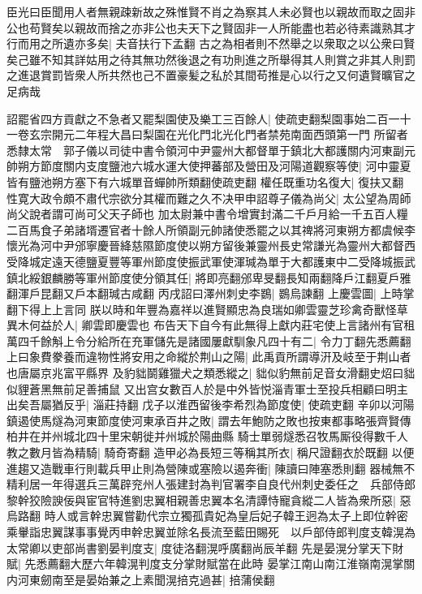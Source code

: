 臣光曰臣聞用人者無親疎新故之殊惟賢不肖之為察其人未必賢也以親故而取之固非公也苟賢矣以親故而捨之亦非公也夫天下之賢固非一人所能盡也若必待素識熟其才行而用之所遺亦多矣|{
	夫音扶行下孟翻}
古之為相者則不然舉之以衆取之以公衆曰賢矣己雖不知其詳姑用之待其無功然後退之有功則進之所舉得其人則賞之非其人則罰之進退賞罰皆衆人所共然也己不置豪髪之私於其間苟推是心以行之又何遺賢曠官之足病哉

詔罷省四方貢獻之不急者又罷梨園使及樂工三百餘人|{
	使疏吏翻梨園事始二百一十一卷玄宗開元二年程大昌曰梨園在光化門北光化門者禁苑南面西頭第一門}
所留者悉隸太常　郭子儀以司徒中書令領河中尹靈州大都督單于鎮北大都護關内河東副元帥朔方節度關内支度鹽池六城水運大使押蕃部及營田及河陽道觀察等使|{
	河中靈夏皆有鹽池朔方塞下有六城單音蟬帥所類翻使疏吏翻}
權任既重功名復大|{
	復扶又翻}
性寛大政令頗不肅代宗欲分其權而難之久不决甲申詔尊子儀為尚父|{
	太公望為周師尚父說者謂可尚可父天子師也}
加太尉兼中書令增實封滿二千戶月給一千五百人糧二百馬食子弟諸壻遷官者十餘人所領副元帥諸使悉罷之以其禆將河東朔方都虞候李懷光為河中尹邠寧慶晉絳慈隰節度使以朔方留後兼靈州長史常謙光為靈州大都督西受降城定遠天德鹽夏豐等軍州節度使振武軍使渾瑊為單于大都護東中二受降城振武鎮北綏銀麟勝等軍州節度使分領其任|{
	將即亮翻邠卑旻翻長知兩翻降戶江翻夏戶雅翻渾戶昆翻又戶本翻瑊古咸翻}
丙戌詔曰澤州刺史李鷃|{
	鷃烏諫翻}
上慶雲圖|{
	上時掌翻下得上上言同}
朕以時和年豐為嘉祥以進賢顯忠為良瑞如卿雲靈芝珍禽奇獸怪草異木何益於人|{
	卿雲即慶雲也}
布告天下自今有此無得上獻内莊宅使上言諸州有官租萬四千餘斛上令分給所在充軍儲先是諸國屢獻馴象凡四十有二|{
	令力丁翻先悉薦翻}
上曰象費豢養而違物性將安用之命縱於荆山之陽|{
	此禹貢所謂導汧及岐至于荆山者也唐屬京兆富平縣界}
及豹貀鬬雞獵犬之類悉縱之|{
	貀似豹無前足音女滑翻史炤曰貀似貍蒼黑無前足善捕鼠}
又出宫女數百人於是中外皆悦淄青軍士至投兵相顧曰明主出矣吾屬猶反乎|{
	淄莊持翻}
戊子以淮西留後李希烈為節度使|{
	使疏吏翻}
辛卯以河陽鎮遏使馬燧為河東節度使河東承百井之敗|{
	謂去年鮑防之敗也按東都事略張齊賢傳柏井在并州城北四十里宋朝徙并州城於陽曲縣}
騎士單弱燧悉召牧馬厮役得數千人教之數月皆為精騎|{
	騎奇寄翻}
造甲必為長短三等稱其所衣|{
	稱尺證翻衣於既翻}
以便進趨又造戰車行則載兵甲止則為營陳或塞險以遏奔衝|{
	陳讀曰陣塞悉則翻}
器械無不精利居一年得選兵三萬辟兖州人張建封為判官署李自良代州刺史委任之　兵部侍郎黎幹狡險諛佞與宦官特進劉忠翼相親善忠翼本名清譚恃寵貪縱二人皆為衆所惡|{
	惡烏路翻}
時人或言幹忠翼嘗勸代宗立獨孤貴妃為皇后妃子韓王迥為太子上即位幹密乘轝詣忠翼謀事事覺丙申幹忠翼並除名長流至藍田賜死　以戶部侍郎判度支韓滉為太常卿以吏部尚書劉晏判度支|{
	度徒洛翻滉呼廣翻尚辰羊翻}
先是晏滉分掌天下財賦|{
	先悉薦翻大歷六年韓滉判度支分掌財賦當在此時}
晏掌江南山南江淮嶺南滉掌關内河東劒南至是晏始兼之上素聞滉掊克過甚|{
	掊蒲侯翻}
